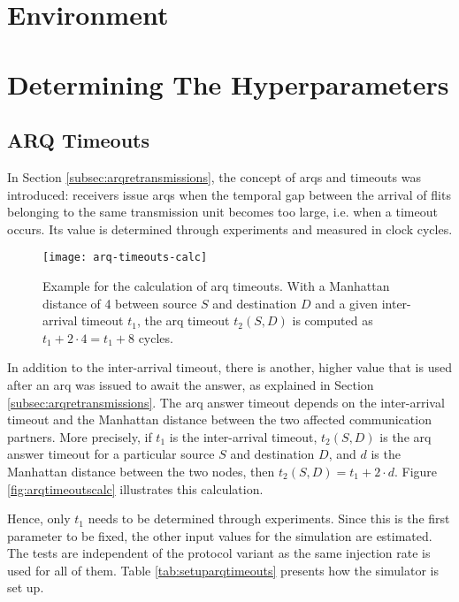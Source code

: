 \section{Environment}

\section{Determining The Hyperparameters}
\subsection{ARQ Timeouts}\label{subsec:arqtimeouts}
In Section \ref{subsec:arqretransmissions}, the concept of \glspl{arq} and timeouts was introduced: receivers issue \glspl{arq} when the temporal gap
between the arrival of flits belonging to the same transmission unit becomes too large, i.e. when a timeout occurs. Its value is determined through
experiments and measured in clock cycles.

\begin{figure}
    \centering
    \texttt{[image: arq-timeouts-calc]}
    \caption[Example of ARQ timeout calculation]{Example for the calculation of \gls{arq} timeouts. With a Manhattan distance of 4 between source $S$ and
    destination $D$ and a given inter-arrival timeout $t_1$, the \gls{arq} timeout $t_2(S, D)$ is computed as $t_1 + 2 \cdot 4 = t_1 + 8$ cycles.}
    \label{fig:arqtimeoutscalc}
\end{figure}

In addition to the inter-arrival timeout, there is another, higher value that is used after an \gls{arq} was issued to await the answer, as explained
in Section \ref{subsec:arqretransmissions}. The \gls{arq} answer timeout depends on the inter-arrival timeout and the Manhattan distance between the
two affected communication partners. More precisely, if $t_1$ is the inter-arrival timeout, $t_2(S, D)$ is the \gls{arq} answer timeout for a
particular source $S$ and destination $D$, and $d$ is the Manhattan distance between the two nodes, then $t_2(S, D) = t_1 + 2 \cdot d$. Figure
\vref{fig:arqtimeoutscalc} illustrates this calculation.

Hence, only $t_1$ needs to be determined through experiments. Since this is the first parameter to be fixed, the other input values for the simulation
are estimated. The tests are independent of the protocol variant as the same injection rate is used for all of them. Table \vref{tab:setuparqtimeouts}
presents how the simulator is set up.

